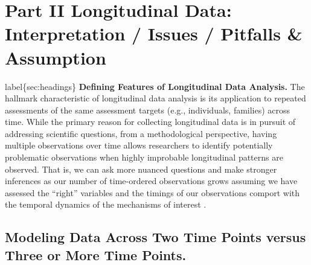 \documentclass[
  10pt,
  letterpaper,
]{article}
\begin{document}
\hypertarget{part-ii-longitudinal-data-interpretation-issues-pitfalls-assumption}{%
\section{Part II Longitudinal Data: Interpretation / Issues / Pitfalls
\&
Assumption}\label{part-ii-longitudinal-data-interpretation-issues-pitfalls-assumption}}

label\{sec:headings\} \textbf{Defining Features of Longitudinal Data
Analysis.} The hallmark characteristic of longitudinal data analysis is
its application to repeated assessments of the same assessment targets
(e.g., individuals, families) across time. While the primary reason for
collecting longitudinal data is in pursuit of addressing scientific
questions, from a methodological perspective, having multiple
observations over time allows researchers to identify potentially
problematic observations when highly improbable longitudinal patterns
are observed. That is, we can ask more nuanced questions and make
stronger inferences as our number of time-ordered observations grows
assuming we have assessed the ``right'' variables and the timings of our
observations comport with the temporal dynamics of the mechanisms of
interest .

\hypertarget{modeling-data-across-two-time-points-versus-three-or-more-time-points.}{%
\subsection{Modeling Data Across Two Time Points versus Three or More
Time
Points.}\label{modeling-data-across-two-time-points-versus-three-or-more-time-points.}}
\end{document}
